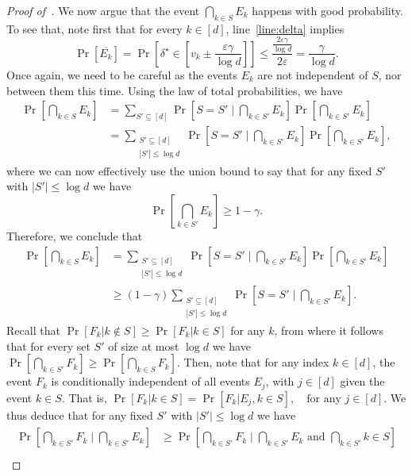 \begin{proof}[Proof of~]
We now argue that the event $\bigcap_{k \in S} E_k$ happens with good probability.
To see that, note first that for every $k \in [d]$, line~\ref{line:delta} implies
\[
	\Pr[\overline{E_k}] = \Pr\left[\delta^\star \in \left[v_k \pm \frac{\varepsilon \gamma}{\log d}\right]\right] \leq \frac{\frac{2\varepsilon \gamma}{\log d}}{2\varepsilon} = \frac{\gamma}{\log d}.
\]
Once again, we need to be careful as the events $E_k$ are not independent of $S$, nor between them this time.
Using the law of total probabilities, we have 
\begin{align*}
	\Pr\left[\bigcap_{k \in S} E_k\right] &= \sum_{S' \subseteq [d]} \Pr\left[S = S'  \mid \bigcap_{k \in S'} E_k \right] \Pr\left[\bigcap_{k \in S'} E_k\right]\\
	&= \sum_{\substack{S' \subseteq [d]\\ |S'| \leq \log d}} \Pr\left[S = S' \mid \bigcap_{k \in S'} E_k\right] \Pr\left[\bigcap_{k \in S'} E_k\right],
\end{align*}
where we can now effectively use the union bound to say that for any fixed $S'$ with $|S'| \leq \log d$ we have
\[ 
	\Pr\left[\bigcap_{k \in S'} E_k \right] \geq 1 - \gamma.
\]
Therefore, we conclude that
\begin{align*}
	\Pr\left[\bigcap_{k \in S} E_k\right] &=  \sum_{\substack{S' \subseteq [d]\\ |S'| \leq \log d}} \Pr\left[S = S'\mid \bigcap_{k \in S'} E_k\right] \Pr\left[\bigcap_{k \in S'} E_k\right]\\
	&\geq (1-\gamma) \sum_{\substack{S' \subseteq [d]\\ |S'| \leq \log d}} \Pr\left[S = S' \mid \bigcap_{k \in S'} E_k\right]. \tag{$\dagger$}
\end{align*}
Recall that $\Pr[F_k | k \not\in S] \geq \Pr[F_k | k \in S]$ for any $k$, from where it follows that for every set $S'$ of size at most $\log d$ we have 
\(
	\Pr\left[\bigcap_{k \in S'} F_k \right] \geq \Pr\left[\bigcap_{k \in S} F_k \right].	
\)
Then, note that for any index $k \in [d]$, the event $F_k$ is conditionally independent of all events $E_{j}$, with $j \in [d]$ given the event $k \in S$. That is,
\(
	\Pr\left[F_k | k \in S\right] = \Pr\left[F_k | E_{j}, k \in S\right], \quad \text{for any } j \in [d].
\)
We thus deduce that for any fixed $S'$ with $|S'| \leq \log d$ we have
\begin{align}\label{eq:2}
	\begin{split}
	\Pr\left[\bigcap_{k \in S'} F_k \mid \bigcap_{k \in S'} E_k\right] &    \geq  \Pr\left[\bigcap_{k \in S'} F_k \mid \bigcap_{k \in S'} E_k \text{ and  } \bigcap_{k \in S'} {k \in S}\right] \\

\end{split}
\end{align}
\end{proof}
